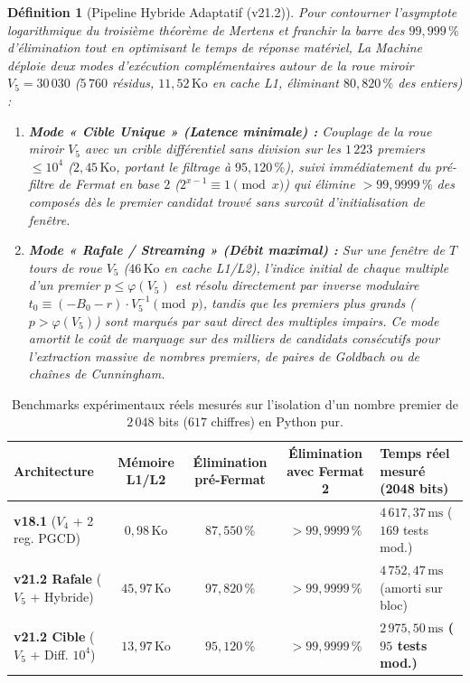 \documentclass[11pt,a4paper]{article}
\newtheorem{definition}{Définition}
\begin{document}
\begin{definition}[Pipeline Hybride Adaptatif (v21.2)]
Pour contourner l'asymptote logarithmique du troisième théorème de Mertens et franchir la barre des $99{,}999\,\%$ d'élimination tout en optimisant le temps de réponse matériel, \emph{La Machine} déploie deux modes d'exécution complémentaires autour de la roue miroir $V_5 = 30\,030$ ($5\,760$ résidus, $11{,}52\,\text{Ko}$ en cache L1, éliminant $80{,}820\,\%$ des entiers) :
\begin{enumerate}
    \item \textbf{Mode « Cible Unique » (Latence minimale) :} Couplage de la roue miroir $V_5$ avec un crible différentiel sans division sur les $1\,223$ premiers $\leq 10^4$ ($2{,}45\,\text{Ko}$, portant le filtrage à $95{,}120\,\%$), suivi immédiatement du pré-filtre de Fermat en base $2$ ($2^{x-1} \equiv 1 \pmod x$) qui élimine $> 99{,}9999\,\%$ des composés dès le premier candidat trouvé sans surcoût d'initialisation de fenêtre.
    \item \textbf{Mode « Rafale / Streaming » (Débit maximal) :} Sur une fenêtre de $T$ tours de roue $V_5$ ($46\,\text{Ko}$ en cache L1/L2), l'indice initial de chaque multiple d'un premier $p \leq \varphi(V_5)$ est résolu directement par inverse modulaire $t_0 \equiv (-B_0 - r) \cdot V_5^{-1} \pmod p$, tandis que les premiers plus grands ($p > \varphi(V_5)$) sont marqués par saut direct des multiples impairs. Ce mode amortit le coût de marquage sur des milliers de candidats consécutifs pour l'extraction massive de nombres premiers, de paires de Goldbach ou de chaînes de Cunningham.
\end{enumerate}
\end{definition}

\begin{table}[h!]
\centering
\caption{Benchmarks expérimentaux réels mesurés sur l'isolation d'un nombre premier de $2\,048$ bits ($617$ chiffres) en Python pur.}
\begin{tabularx}{\textwidth}{l c c c X}
\toprule
\textbf{Architecture} & \textbf{Mémoire L1/L2} & \textbf{Élimination pré-Fermat} & \textbf{Élimination avec Fermat 2} & \textbf{Temps réel mesuré (2048 bits)} \\
\midrule
\textbf{v18.1} ($V_4$ + 2 reg. PGCD) & $0{,}98\,\text{Ko}$ & $87{,}550\,\%$ & $> 99{,}9999\,\%$ & $4\,617{,}37\,\text{ms}$ ($169$ tests mod.) \\
\textbf{v21.2 Rafale} ($V_5$ + Hybride) & $45{,}97\,\text{Ko}$ & $97{,}820\,\%$ & $> 99{,}9999\,\%$ & $4\,752{,}47\,\text{ms}$ (amorti sur bloc) \\
\textbf{v21.2 Cible} ($V_5$ + Diff. $10^4$) & \textbf{$13{,}97\,\text{Ko}$} & \textbf{$95{,}120\,\%$} & \textbf{$> 99{,}9999\,\%$} & \textbf{$2\,975{,}50\,\text{ms}$ ($95$ tests mod.)} \\
\bottomrule
\end{tabularx}
\end{table}
\end{document}
